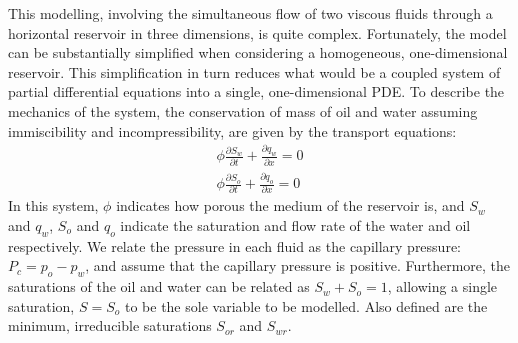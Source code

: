 \documentclass[11pt]{article}
\begin{document}
This modelling, involving the simultaneous flow of two viscous fluids through a horizontal reservoir in three dimensions, is quite complex. Fortunately, the model can be substantially simplified when considering a homogeneous, one-dimensional reservoir. This simplification in turn reduces what would be a coupled system of partial differential equations into a single, one-dimensional PDE. To describe the mechanics of the system, the conservation of mass of oil and water assuming immiscibility and incompressibility, are given by the transport equations:
\begin{eqnarray}
\phi\frac{\partial S_w}{\partial t} + \frac{\partial q_w}{\partial x} = 0\\
\phi\frac{\partial S_o}{\partial t} + \frac{\partial q_o}{\partial x} = 0
\end{eqnarray}
In this system, $\phi$ indicates how porous the medium of the reservoir is, and $S_w$ and $q_w$, $S_o$ and $q_o$ indicate the saturation and flow rate of the water and oil respectively. We relate the pressure in each fluid as the capillary pressure: $P_c = p_o-p_w$, and assume that the capillary pressure is positive. Furthermore, the saturations of the oil and water can be related as $S_w +S_o = 1$, allowing a single saturation, $S=S_o$ to be the sole variable to be modelled. Also defined are the minimum, irreducible saturations $S_{or}$ and $S_{wr}$.\\
\end{document}
